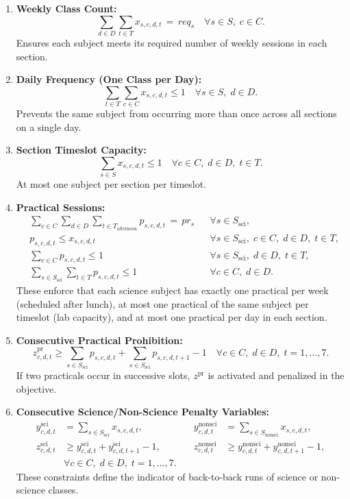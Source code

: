 \documentclass[11pt]{article}
\begin{document}
\begin{enumerate}
  \item \textbf{Weekly Class Count:}
  \[
    \sum_{d\in D}\sum_{t\in T} x_{s,c,d,t} \,=\, req_s
    \quad\forall s\in S,\;c\in C.
  \]
  Ensures each subject meets its required number of weekly sessions in each section.

  \item \textbf{Daily Frequency (One Class per Day):}
  \[
    \sum_{t\in T}\sum_{c\in C} x_{s,c,d,t} \le 1
    \quad\forall s\in S,\;d\in D.
  \]
  Prevents the same subject from occurring more than once across all sections on a single day.

  \item \textbf{Section Timeslot Capacity:}
  \[
    \sum_{s\in S} x_{s,c,d,t} \le 1
    \quad\forall c\in C,\;d\in D,\;t\in T.
  \]
  At most one subject per section per timeslot.

  \item \textbf{Practical Sessions:}
  \begin{align*}
    &\sum_{c\in C}\sum_{d\in D}\sum_{t\in T_{\mathrm{afternoon}}} p_{s,c,d,t} \,=\, pr_s
    &&\forall s\in S_{\mathrm{sci}}, \\
    &p_{s,c,d,t} \le x_{s,c,d,t}
    &&\forall s\in S_{\mathrm{sci}},\;c\in C,\;d\in D,\;t\in T, \\
    &\sum_{c\in C} p_{s,c,d,t} \le 1
    &&\forall s\in S_{\mathrm{sci}},\;d\in D,\;t\in T, \\
    &\sum_{s\in S_{\mathrm{sci}}}\sum_{t\in T} p_{s,c,d,t} \le 1
    &&\forall c\in C,\;d\in D.
  \end{align*}
  These enforce that each science subject has exactly one practical per week (scheduled after lunch), at most one practical of the same subject per timeslot (lab capacity), and at most one practical per day in each section.

  \item \textbf{Consecutive Practical Prohibition:}
  \[
    z^{\mathrm{pr}}_{c,d,t} \ge \sum_{s\in S_{\mathrm{sci}}} p_{s,c,d,t} + \sum_{s\in S_{\mathrm{sci}}} p_{s,c,d,t+1} - 1
    \quad\forall c\in C,\;d\in D,\;t=1,\dots,7.
  \]
  If two practicals occur in successive slots, $z^{\mathrm{pr}}$ is activated and penalized in the objective.

  \item \textbf{Consecutive Science/Non-Science Penalty Variables:}
  \begin{align*}
    y^{\mathrm{sci}}_{c,d,t} &= \sum_{s\in S_{\mathrm{sci}}} x_{s,c,d,t},
    &\quad y^{\mathrm{nonsci}}_{c,d,t} &= \sum_{s\in S_{\mathrm{nonsci}}} x_{s,c,d,t}, \\
    z^{\mathrm{sci}}_{c,d,t} &\ge y^{\mathrm{sci}}_{c,d,t} + y^{\mathrm{sci}}_{c,d,t+1} - 1,
    &\quad z^{\mathrm{nonsci}}_{c,d,t} &\ge y^{\mathrm{nonsci}}_{c,d,t} + y^{\mathrm{nonsci}}_{c,d,t+1} - 1, \\
    &\forall c\in C,\;d\in D,\;t=1,\dots,7.
  \end{align*}
  These constraints define the indicator of back-to-back runs of science or non-science classes.


\end{enumerate}
\end{document}
